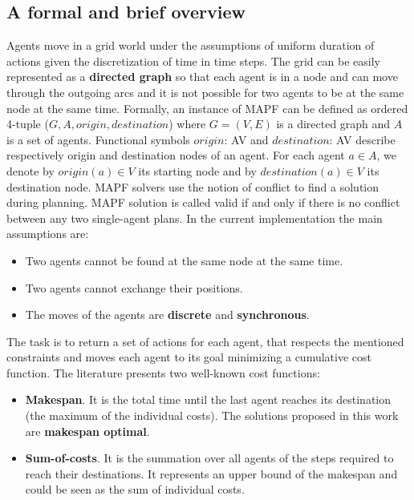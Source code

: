 \documentclass[12pt, a4paper, hidelinks]{article}
\numberwithin{equation}{section}
\begin{document}
\subsection*{A formal and brief overview}
Agents move in a grid world under the assumptions of uniform duration of actions given the discretization of time in time steps.
The grid can be easily represented as a \textbf{directed graph} so that each agent is in a node and can move through the outgoing arcs and it is not possible for two agents to be at the same node at the same time.
Formally, an instance of MAPF can be defined as ordered 4-tuple ($G, A, origin, destination$) where $G = (V, E)$ is a directed graph and $A$ is a set of agents.
Functional symbols $origin$: A\textrightarrow V and $destination$: A\textrightarrow V describe respectively origin and destination nodes of an agent.
For each agent $a\in A$, we denote by $origin(a)\in V$ its starting node and by $destination(a)\in V$ its destination node.
MAPF solvers use the notion of conflict to find a solution during planning.
MAPF solution is called valid if and only if there is no conflict between any two single-agent plans.
In the current implementation the main assumptions are:

\begin{itemize} 
\item Two agents cannot be found at the same node at the same time.
\item Two agents cannot exchange their positions.
\item The moves of the agents are \textbf{discrete} and \textbf{synchronous}.\\
\end{itemize}
The task is to return a set of actions for each agent, that respects the mentioned constraints and moves each agent to its goal minimizing a cumulative cost function.
The literature presents two well-known cost functions:

\begin{itemize}
\item \textbf{Makespan}.
It is the total time until the last agent reaches its destination (the maximum of the individual costs).
The solutions proposed in this work are \textbf{makespan optimal}.
\item \textbf{Sum-of-costs}.
It is the summation over all agents of the steps required to reach their destinations. 
It represents an upper bound of the makespan and could be seen as the sum of individual costs.
\end{itemize}
\end{document}

